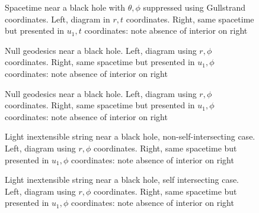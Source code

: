 \documentclass{article}
\begin{document}
\begin{figure}%
    \centering
    \caption{Spacetime near a black hole with $\theta,\phi$ suppressed
      using Gullstrand coordinates.  Left, diagram in $r,t$
      coordinates.  Right, same spacetime but presented in $u_1,t$
      coordinates: note absence of interior on right}
    \label{gullstrand}%
\end{figure}

\begin{figure}%
    \centering
    \caption{Null geodesics near a black hole.  Left, diagram using $r,\phi$
      coordinates.  Right, same spacetime but presented in $u_1,\phi$
      coordinates: note absence of interior on right}
    \label{light_2}%
\end{figure}

\begin{figure}%
    \centering
    \caption{Null geodesics near a black hole.  Left, diagram using $r,\phi$
      coordinates.  Right, same spacetime but presented in $u_1,\phi$
      coordinates: note absence of interior on right}
    \label{light_closest_2}%
\end{figure}

\begin{figure}%
    \centering
    \caption{Light inextensible string near a black hole,
      non-self-intersecting case.  Left, diagram using $r,\phi$
      coordinates.  Right, same spacetime but presented in $u_1,\phi$
      coordinates: note absence of interior on right}
    \label{closest_approach_nonself}%
\end{figure}

\begin{figure}%
    \centering
    \caption{Light inextensible string near a black hole, self intersecting case.  Left, diagram using $r,\phi$
      coordinates.  Right, same spacetime but presented in $u_1,\phi$
      coordinates: note absence of interior on right}
    \label{closest_approach_self}%
\end{figure}


  
\end{document}
